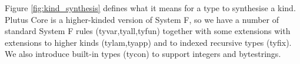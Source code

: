 \documentclass[a4paper]{article}
\newcommand{\judgmentdef}[2]{\fbox{#1}

\vspace{0.5em}

#2}
\newcommand{\ctxni}[2]{#1 \ni #2}
\newcommand{\termJ}[2]{#1 : #2}
\newcommand{\typeJ}[2]{#1 :: #2}
\begin{document}
\begin{figure}[H]
{%
%
%
%
%
%
%


}
    \label{fig:contexts}
\end{figure}

\newpage
\noindent Figure \ref{fig:kind_synthesis} defines what
it means for a type to synthesise a kind. Plutus Core is a
higher-kinded version of System F, so we have a number of standard
System F rules (\textsf{tyvar},\textsf{tyall},\textsf{tyfun}) together
with some extensions with extensions to higher kinds
(\textsf{tylam},\textsf{tyapp}) and to indexed recursive types
(\textsf{tyfix}). We also introduce built-in types (\textsf{tycon}) to support
integers and bytestrings.

\end{document}
